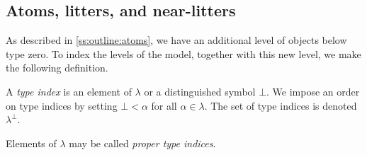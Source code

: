 \subsection{Atoms, litters, and near-litters}

As described in \cref{ss:outline:atoms}, we have an additional level of objects below type zero.
To index the levels of the model, together with this new level, we make the following definition.
\begin{definition}
    A \emph{type index} is an element of \( \lambda \) or a distinguished symbol \( \bot \).
    We impose an order on type indices by setting \( \bot < \alpha \) for all \( \alpha \in \lambda \).
    The set of type indices is denoted \( \lambda^\bot \).
\end{definition}
Elements of \( \lambda \) may be called \emph{proper type indices}.

